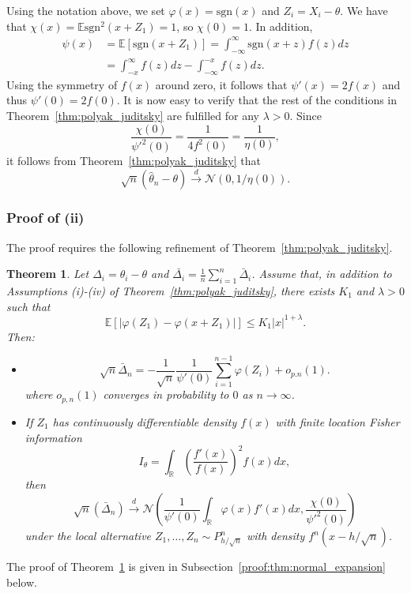 \documentclass[letterpaper, 11pt]{IEEEtran}      %
\newtheorem{thm}{\bf{Theorem}}
\newcommand{\ex}[1]{\ensuremath{\mathbb{E}\left[ #1\right]}}
\newcommand{\sgn}{\mathrm{sgn} }
\newcommand{\Ncal}{\mathcal{N}}
\begin{document}
Using the notation above, we set $\varphi(x) = \sgn(x)$ and $Z_i = X_i - \theta$. We have that $\chi(x) = \mathbb E \sgn^2(x+Z_1) = 1$, so $\chi(0) = 1$. In addition,
\begin{align*}
\psi(x) & = \ex{ \sgn(x+ Z_1) }= \int_{-\infty}^\infty \sgn(x+z) f(z) dz \\
& = \int_{-x}^\infty f(z) dz -\int_{-\infty}^{-x} f(z) dz. 
\end{align*}
Using the symmetry of $f(x)$ around zero, it follows that $\psi'(x) = 2f(x)$ and thus $\psi'(0) = 2f(0)$. It is now easy to verify that the rest of the conditions in Theorem~\ref{thm:polyak_juditsky} are fulfilled for any $\lambda > 0$. Since 
\[
\frac{\chi(0)}{\psi'^2(0)} = \frac{1}{4 f^2(0)} = \frac{1}{\eta(0)},
\]
it follows from Theorem~\ref{thm:polyak_juditsky} that
\[
\sqrt{n}\left(\hat{\theta}_n-\theta \right) \overset{d}{\to} \Ncal \left(0, 1/ \eta(0)\right). 
\]

\subsubsection*{Proof of (ii)}
The proof requires the following refinement of Theorem~\ref{thm:polyak_juditsky}.
\begin{thm} \label{thm:normal_expansion}
Let $\Delta_i = \theta_i - \theta$ and $\bar{\Delta_i} = \frac{1}{n} \sum_{i=1}^n \bar{\Delta}_i$. 
Assume that, in addition to Assumptions (i)-(iv) of Theorem~\ref{thm:polyak_juditsky}, there exists $K_1$ and $\lambda>0$ such that
\begin{equation}
\ex{\left| \varphi(Z_1) - \varphi(x+Z_1)  \right|} \leq K_1 |x|^{1+\lambda}
\label{eq:PJ_additional_cond}. 
\end{equation}
Then:
\begin{itemize}
\item[(i)] \begin{equation}
\sqrt{n} \bar{\Delta}_n = -\frac{1}{\sqrt{n}} \frac{1}{\psi'(0)} \sum_{i=1}^{n-1} \varphi(Z_i)+ o_{p.n}(1). \label{eq:normal_expansion_lem}
\end{equation}
where $o_{p,n}(1)$ converges in probability to $0$ as $n\to \infty$.
\item[(ii)] If $Z_1$ has continuously differentiable density $f(x)$ with finite location Fisher information 
\[
I_\theta = \int_{\mathbb R} \left( \frac{f'(x)}{f(x)} \right)^2 f(x) dx,
\]
then
\[
\sqrt{n} \left( \bar{\Delta}_n \right) \overset{d}{\to} \Ncal\left( \frac{1}{\psi'(0)} \int_{\mathbb R} \varphi(x) f'(x) dx  , \frac{\chi(0)}{\psi'^2(0)} \right)
\]
under the local alternative $Z_1,\ldots,Z_n \sim P^n_{h/\sqrt{n}}$ with density $f^n(x-h/\sqrt{n})$.
\end{itemize}
\end{thm}
The proof of Theorem~\ref{thm:normal_expansion} is given in Subsection~\ref{proof:thm:normal_expansion} below. \\
\end{document}
